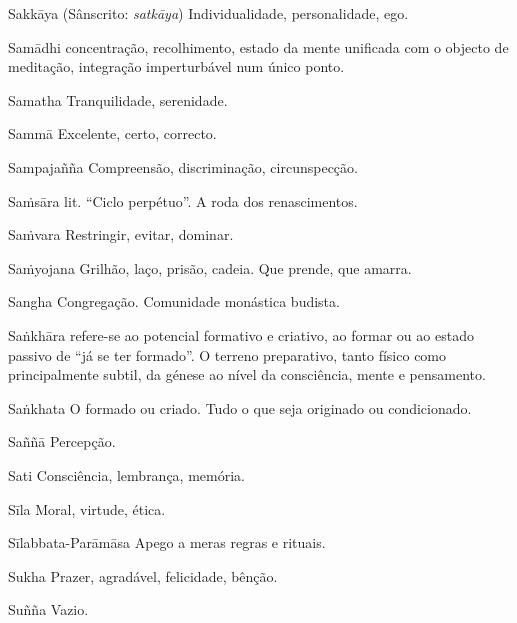 \begin{glossarydescription}

\item[Sakkāya] (Sânscrito: \emph{satkāya}) Individualidade, personalidade, ego.

\item[Samādhi] concentração, recolhimento, estado da mente unificada com o
objecto de meditação, integração imperturbável num único ponto.

\item[Samatha] Tranquilidade, serenidade.

\item[Sammā] Excelente, certo, correcto.

\item[Sampajañña] Compreensão, discriminação, circunspecção.

\item[Saṁsāra] lit. ``Ciclo perpétuo''. A roda dos renascimentos.

\item[Saṁvara] Restringir, evitar, dominar.

\item[Saṁyojana] Grilhão, laço, prisão, cadeia. Que prende, que amarra.

\item[Sangha] Congregação. Comunidade monástica budista.

\item[Saṅkhāra] refere-se ao potencial formativo e criativo, ao formar ou ao
estado passivo de ``já se ter formado''. O terreno preparativo, tanto físico
como principalmente subtil, da génese ao nível da consciência, mente e
pensamento.

\item[Saṅkhata] O formado ou criado. Tudo o que seja originado ou condicionado.

\item[Saññā] Percepção.

\item[Sati] Consciência, lembrança, memória.

\item[Sīla] Moral, virtude, ética.

\item[Sīlabbata-Parāmāsa] Apego a meras regras e rituais.

\item[Sukha] Prazer, agradável, felicidade, bênção.

\item[Suñña] Vazio.

\end{glossarydescription}

